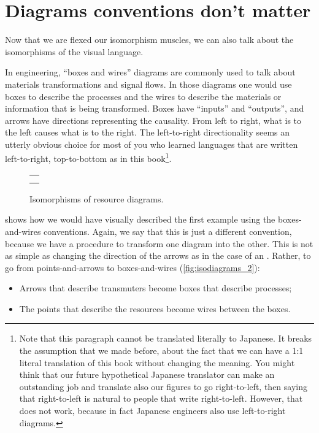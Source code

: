 \begin{figure}[h!]
    \centering
    \caption{}
    \label{fig:inverted_2}
\end{figure}

\section[Diagram conventions]{Diagrams conventions don't matter}

Now that we are flexed our isomorphism muscles, we can also talk about the isomorphisms of the visual language.

In engineering, ``boxes and wires'' diagrams are commonly used to talk about materials transformations and signal flows.
In those diagrams one would use boxes to describe the processes and the wires to describe the materials or information that is being transformed.
Boxes have ``inputs'' and ``outputs'', and arrows have directions representing the causality.
From left to right, what is to the left causes what is to the right.
The left-to-right directionality seems an utterly obvious choice for most of you who learned languages that are written left-to-right, top-to-bottom as in this book\footnote{
    Note that this paragraph cannot be translated literally to Japanese.
    It breaks the assumption that we made before, about the fact that we can have a 1:1 literal translation of this book without changing the meaning.
    You might think that our future hypothetical Japanese translator can make an outstanding job and translate also our figures to go right-to-left, then saying that right-to-left is natural to people that write right-to-left.
    However, that does not work, because in fact Japanese engineers also use left-to-right diagrams.
}.
\begin{figure}[h!]
    \centering
    \begin{tabular}{c}
        {20_iso_diags_1} \\
        {20_iso_diags_2}
    \end{tabular}
    \caption{Isomorphisms of resource diagrams.  }
    \label{fig:isodiagrams}
\end{figure}

 shows how we would have visually described the first example using the boxes-and-wires conventions.
Again, we say that this is just a different convention, because we have a procedure to transform one diagram into the other.
This is not as simple as changing the direction of the arrows as in the case of an .
Rather, to go from points-and-arrows to boxes-and-wires (\cref{fig:isodiagrams_2}):
\begin{itemize}
    \item Arrows that describe transmuters become boxes that describe processes;
    \item The points that describe the resources become wires between the boxes.
\end{itemize}


